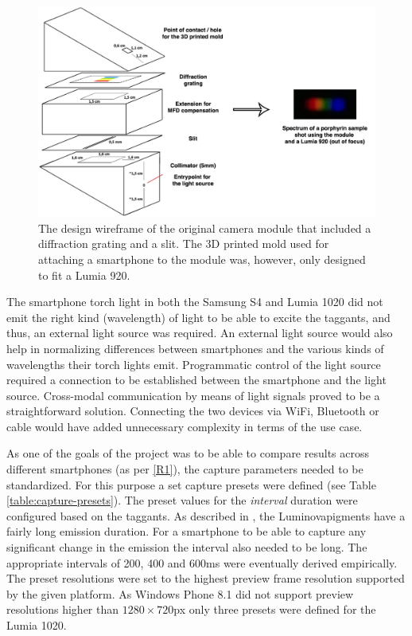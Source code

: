 \documentclass[thesis.tex]{subfiles}
\begin{document}
\begin{figure}[h!]
  \centering \includegraphics[page=1,width=\textwidth]{images/findings/original_camera_module}
  \caption{The design wireframe of the original camera module that included a diffraction grating and a slit. The 3D printed mold used for attaching a smartphone to the module was, however, only designed to fit a Lumia 920.}
  \label{figure:origina-camera-module}
\end{figure}

The smartphone torch light in both the Samsung S4 and Lumia 1020 did not emit the right kind (wavelength) of light to be able to excite the taggants, and thus, an external light source was required. An external light source would also help in normalizing differences between smartphones and the various kinds of wavelengths their torch lights emit. Programmatic control of the light source required a connection to be established between the smartphone and the light source. Cross-modal communication by means of light signals proved to be a straightforward solution. Connecting the two devices via WiFi, Bluetooth or cable would have added unnecessary complexity in terms of the use case.

As one of the goals of the project was to be able to compare results across different smartphones (as per \ref{R1}), the capture parameters needed to be standardized. For this purpose a set capture presets were defined (see Table \ref{table:capture-presets}). The preset values for the \emph{interval} duration were configured based on the taggants. As described in \cite{luminova}, the Luminova\textregistered pigments have a fairly long emission duration. For a smartphone to be able to capture any significant change in the emission the interval also needed to be long. The appropriate intervals of 200, 400 and 600ms were eventually derived empirically. The preset resolutions were set to the highest preview frame resolution supported by the given platform. As Windows Phone 8.1 did not support preview resolutions higher than $1280\times720$px only three presets were defined for the Lumia 1020.
\end{document}
